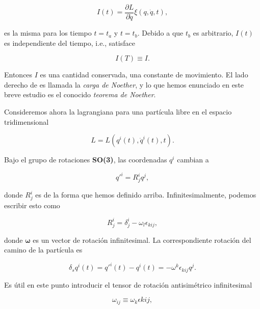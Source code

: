 \documentclass[a4paper,10pt]{article}
\numberwithin{equation}{section}
\begin{document}
\begin{equation}
 I(t) = \frac{\partial L}{\partial \dot{q}}\xi(q,\dot{q},t),
 \label{eq:noet5}
\end{equation}

es la misma para los tiempo $t=t_a$ y $t=t_b$. Debido a que $t_b$ es arbitrario, 
$I(t)$ es independiente del tiempo, i.e., satisface

\begin{equation}
 I(T) \equiv I.
 \label{eq:noet6}
\end{equation}

Entonces $I$ es una cantidad conservada, una constante de movimiento. El lado derecho 
de  es llamada la \emph{carga de Noether}, y lo que hemos enunciado en 
este breve estudio es el conocido \emph{teorema de Noether}.

\vspace{.3cm}

Consideremos ahora la lagrangiana para una partícula libre en el espacio tridimensional

\begin{equation}
 L = L(q^i(t),\dot{q}^i(t),t).
\end{equation}

Bajo el grupo de rotaciones \textbf{SO(3)}, las coordenadas $q^i$ cambian a

\begin{equation}
 q'^i = R^i_j q^j,
\end{equation}

donde $ R^i_j$ es de la forma que hemos definido arriba. Infinitesimalmente, podemos 
escribir esto como

\begin{equation}
 R^i_j = \delta^i_j - \omega_l \epsilon_{kij},
\end{equation}

donde $\mathbf{\omega}$ es un vector de rotación infinitesimal. La correspondiente 
rotación del camino de la partícula es 

\begin{equation}
 \delta_s q^i(t) = q'^i(t) - q^i(t) = - \omega^k\epsilon_{kij}q^j.
\end{equation}

Es útil en este punto introducir el tensor de rotación antisimétrico infinitesimal 

\begin{equation}
 \omega_{ij} \equiv \omega_k \epsilon{kij},
\end{equation}
\end{document}
